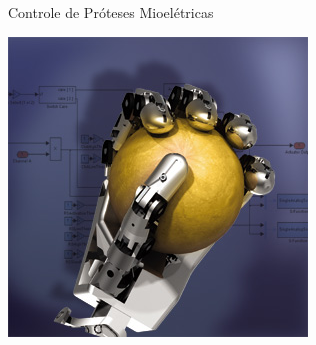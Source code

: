 \documentclass{beamer}
\begin{document}
\begin{frame}
\begin{columns}[c]
				\begin{figure}
					Controle de Próteses Mioelétricas
					\begin{center}
						\includegraphics[width=\textwidth]{./img/prosthesis.jpg}
					\end{center}
				\end{figure}
		\end{columns}
	\end{frame}
	
	
\end{document}
